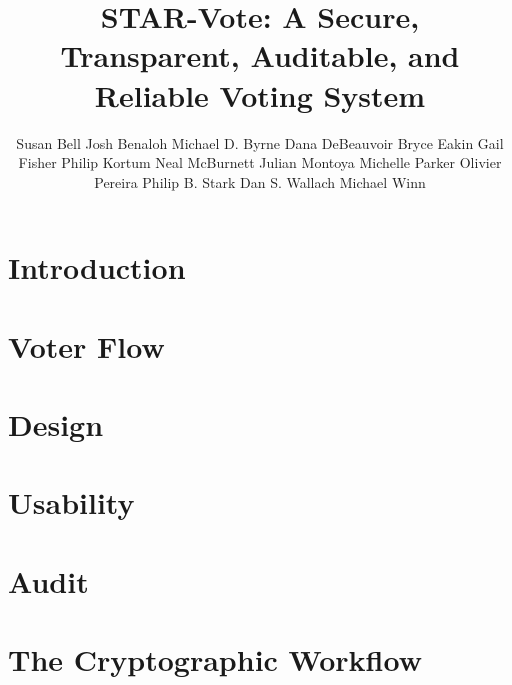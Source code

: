 \documentclass[jets]{usenixjournal}
\newcommand{\projname}{STAR-Vote\xspace}
\begin{document}
\author{
Susan Bell
Josh Benaloh
Michael D. Byrne
Dana DeBeauvoir
Bryce Eakin
Gail Fisher
Philip Kortum
Neal McBurnett
Julian Montoya
Michelle Parker
Olivier Pereira
Philip B. Stark
Dan S. Wallach
Michael Winn
}
 
\title{\projname: A Secure, Transparent, Auditable, and Reliable Voting System}

\begin{abstract}

\end{abstract}

\maketitle

\section{Introduction}


\section{Voter Flow}


\section{Design}


\section{Usability}


\section{Audit}


\section{The Cryptographic Workflow}

\end{document}
